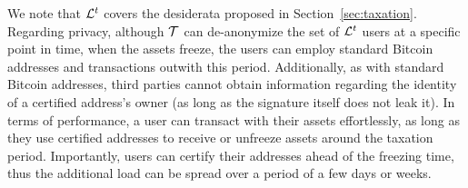 We note that $\mathcal{L}^{t}$ covers the desiderata proposed in
Section~\ref{sec:taxation}. Regarding privacy, although $\mathcal{T}$ can
de-anonymize the set of $\mathcal{L}^{t}$ users at a specific point in time, \ie when
the assets freeze, the users can employ standard Bitcoin addresses and
transactions outwith this period. Additionally, as with standard Bitcoin
addresses, third parties cannot obtain information regarding the identity of a
certified address's owner (as long as the signature itself does not leak it).
In terms of performance, a user can transact with their assets effortlessly, as
long as they use certified addresses to receive or unfreeze assets around the
taxation period. Importantly, users can certify their addresses ahead
of the freezing time, thus the additional load can be spread over a period
of a few days or weeks.
